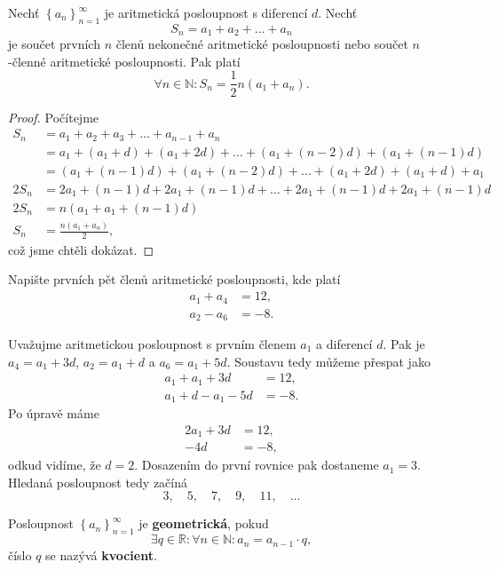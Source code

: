 \begin{veta}
Nechť $\left \{ a_n \right \}_{n=1}^\infty $ je aritmetická posloupnost s diferencí
$d$. Nechť
$$S_n=a_1+a_2+\dots+a_n$$
je součet prvních $n$ členů nekonečné aritmetické posloupnosti nebo součet
$n$-členné aritmetické posloupnosti. Pak platí
$$\forall n \in \mathbb N\colon S_n = \frac{1}{2}n(a_1+a_n).$$
\end{veta}

\begin{proof}
Počítejme
\begin{align*}
    S_n &= a_1+a_2+a_3+\dots+a_{n-1}+a_n \\
    &= a_1 + (a_1+d)+ (a_1+2d)+ \dots + (a_1+(n-2)d)+(a_1+(n-1)d)\\
    &= (a_1+(n-1)d)+(a_1+(n-2)d)+\dots+(a_1+2d)+(a_1+d)+a_1\\
    2S_n &= 2a_1 + (n-1)d + 2a_1 + (n-1)d + \dots + 2a_1 + (n-1)d + 2a_1 + (n-1)d\\
    2S_n &= n (a_1 + a_1 + (n-1)d)\\
    S_n &= \frac{n(a_1+a_n)}{2},
\end{align*}
což jsme chtěli dokázat. \qedhere
\end{proof}

\begin{priklad}
Napište prvních pět členů aritmetické posloupnosti, kde platí
\begin{align*}
    a_1+a_4&=12,\\
    a_2-a_6&=-8.
\end{align*}
\end{priklad}

\begin{reseni}
Uvažujme aritmetickou posloupnost s prvním členem $a_1$ a diferencí $d$. Pak je $a_4 = a_1 + 3d$,
$a_2 = a_1 + d$ a $a_6 = a_1 + 5d$. Soustavu tedy můžeme přespat jako
\begin{align*}
	a_1 + a_1 + 3d &= 12, \\
	a_1 + d - a_1 - 5d &= -8.
\end{align*}
Po úpravě máme
\begin{align*}
	2a_1 + 3d &= 12, \\
	- 4d  &= -8,
\end{align*}
odkud vidíme, že $d= 2$. Dosazením do první rovnice pak dostaneme $a_1=3$. Hledaná posloupnost tedy začíná
$$
    3, \quad 5, \quad 7, \quad 9, \quad 11, \quad \dots
$$
\end{reseni}

\begin{definition}
Posloupnost $\left \{ a_n \right \}_{n=1}^\infty $ je \textbf{geometrická}, pokud
$$\exists q \in \mathbb R\colon \forall n \in \mathbb N\colon a_n=a_{n-1}\cdot q,$$
číslo $q$ se nazývá \textbf{kvocient}.
\end{definition}


